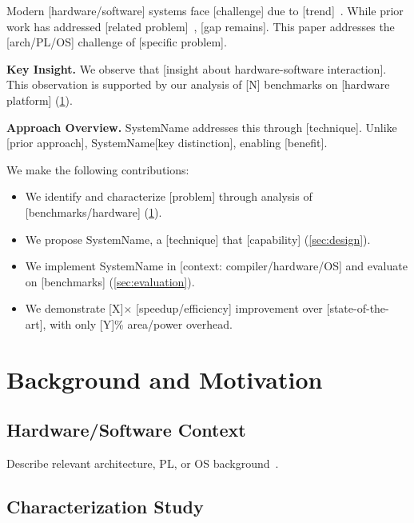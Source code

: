 \documentclass[sigplan,10pt]{acmart}
\newcommand{\system}{SystemName\xspace}
\newcommand{\para}[1]{\smallskip\noindent\textbf{#1.}}
\begin{document}

Modern [hardware/software] systems face [challenge] due to
[trend]~\cite{hennessy2019new}. While prior work has addressed
[related problem]~\cite{jouppi2017tpu}, [gap remains].
This paper addresses the [arch/PL/OS] challenge of [specific problem].

\para{Key Insight}
We observe that [insight about hardware-software interaction]. This
observation is supported by our analysis of [N] benchmarks on
[hardware platform] (\cref{sec:background}).

\para{Approach Overview}
\system addresses this through [technique]. Unlike [prior approach],
\system [key distinction], enabling [benefit].

We make the following contributions:
\begin{itemize}
  \item We identify and characterize [problem] through analysis of
        [benchmarks/hardware] (\cref{sec:background}).
  \item We propose \system, a [technique] that [capability]
        (\cref{sec:design}).
  \item We implement \system in [context: compiler/hardware/OS] and
        evaluate on [benchmarks] (\cref{sec:evaluation}).
  \item We demonstrate [X]$\times$ [speedup/efficiency] improvement
        over [state-of-the-art], with only [Y]\% area/power overhead.
\end{itemize}


\section{Background and Motivation}
\label{sec:background}

\subsection{Hardware/Software Context}

Describe relevant architecture, PL, or OS
background~\cite{lattner2004llvm}.

\subsection{Characterization Study}
\end{document}
